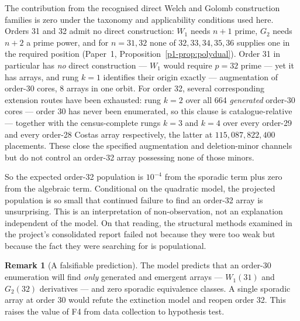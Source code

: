 \documentclass[11pt,a4paper,oneside]{report}
\theoremstyle{definition}
\newtheorem{remark}[theorem]{Remark}
\begin{document}
The contribution from the recognised direct Welch and Golomb construction
families is zero under the taxonomy and applicability conditions used here.
Orders 31 and 32 admit no direct construction: $W_1$ needs $n+1$ prime, $G_2$ needs $n+2$ a prime power, and for
$n=31,32$ none of $32,33,34,35,36$ supplies one in the required position
(Paper~1, Proposition~\ref{p1-prop:polydual}). Order 31 in particular has \emph{no} direct
construction --- $W_1$ would require $p=32$ prime --- yet it has arrays, and rung
$k=1$ identifies their origin exactly --- augmentation of order-30 cores, 8
arrays in one orbit. For order 32, several corresponding extension routes have
been exhausted: rung $k=2$ over all 664 \emph{generated} order-30 cores --- order
30 has never been enumerated, so this clause is catalogue-relative --- together
with the census-complete rungs $k=3$ and $k=4$ over every order-29 and every
order-28 Costas array respectively, the latter at $115{,}087{,}822{,}400$
placements. These close the specified augmentation and deletion-minor channels
but do not control an order-32 array possessing none of those minors.

So the expected order-32 population is $10^{-4}$ from the sporadic term plus zero
from the algebraic term. Conditional on the quadratic model, the projected population is so small that continued failure to
find an order-32 array is unsurprising. This is an interpretation of non-observation, not an
explanation independent of the model. On that reading, the structural methods examined in the project's consolidated report failed not because
they were too weak but because the fact they were searching for is populational.

\begin{remark}[A falsifiable prediction]
\label{p6-rem:falsifiable}
The model predicts that an order-30 enumeration will find \emph{only} generated
and emergent arrays --- $W_1(31)$ and $G_2(32)$ derivatives --- and zero
sporadic equivalence classes. A single sporadic array at order 30 would refute
the extinction model and reopen order 32. This raises the value of F4 from data
collection to hypothesis test.
\end{remark}
\end{document}
